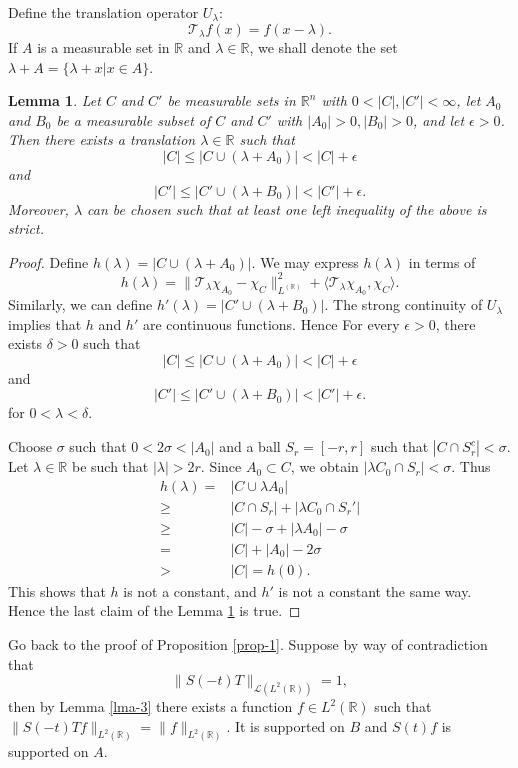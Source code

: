 \documentclass[12pt]{amsart}
\def\R {\mathbb{R}}
\newtheorem{lemma}[proposition]{Lemma}
\theoremstyle{definition}
\numberwithin{equation}{section}
\begin{document}
Define the translation operator $U_{\lambda}$:
$$
\mathcal{T}_{\lambda}f(x)=f(x-\lambda ).
$$
If $A$ is a measurable set in $\mathbb{R}$ and $\lambda\in \mathbb{R}$, we shall denote the set $\lambda+ A=\{\lambda+x\lvert x\in A\}$.
\begin{lemma}\label{lma-4}
  Let $C$ and $C'$ be  measurable sets in $\mathbb{R}^n$ with $0<|C|,|C'|<\infty$, let $A_0$ and $B_0$ be a measurable subset of $C$ and $C'$ with $|A_0|>0,|B_0|>0$, and let $\epsilon>0$. Then there exists a translation $\lambda\in \mathbb{R}$ such that 
  $$
  |C|\le|C\cup (\lambda+ A_0)|<|C|+\epsilon
  $$
  and
  $$
  |C'|\le |C'\cup (\lambda +B_0)|<|C'|+\epsilon.
  $$
  Moreover, $\lambda$ can be chosen such that at least one left inequality of the above is strict.

\end{lemma}
\begin{proof}
  Define $h(\lambda)=|C\cup( \lambda+ A_0)|$. We may express $h(\lambda)$ in terms of 
  $$
  h(\lambda)=\| \mathcal{T}_\lambda \chi_{A_0}-\chi_C \|^2_{L^(\mathbb{R})}+\langle \mathcal{T}_\lambda \chi_{A_0},\chi_{C}\rangle.
  $$
  Similarly, we can define $h'(\lambda)=|C'\cup(\lambda+ B_0)|$.
  The strong continuity of $U_\lambda$ implies that $h$ and $h'$ are continuous functions. Hence For every $\epsilon>0$, there exists $\delta>0$ such that 
   $$
   |C|\le |C\cup (\lambda+ A_0)|<|C|+\epsilon
   $$
   and
   $$
   |C'|\le |C'\cup (\lambda+ B_0)|<|C'|+\epsilon.
   $$
   for $0<\lambda<\delta$.

   Choose $\sigma$ such that $0<2\sigma <|A_0|$ and a ball $S_r=[-r,r]$ such that $|C\cap S_r^c|<\sigma$. Let $\lambda \in \mathbb{R}$ be such that $|\lambda|>2r$. Since $A_0\subset C$, we obtain $|\lambda C_0 \cap S_r|<\sigma$. Thus
   \begin{align*}
     h(\lambda)=&|C\cup \lambda A_0|\\
     \ge & |C\cap S_r|+|\lambda C_0\cap S_r'|\\
     \ge & |C|-\sigma +|\lambda A_0|-\sigma\\
     =& |C|+|A_0|-2\sigma\\
     >&|C|=h(0).
   \end{align*}
   This shows that $h$ is not a constant, and $h'$ is not a constant the same way. Hence the last claim of the Lemma \ref{lma-4} is true.
\end{proof}

Go back to the proof of Proposition \ref{prop-1}. Suppose by way of contradiction that
$$\|S(-t) T \|_{\mathcal{L}(L^2(\mathbb{R}))}=1,$$
then by Lemma \ref{lma-3} there exists a function $f\in L^2(\mathbb{R})$ such that $\|S(-t)Tf\|_{L^2(\R)}=\|f\|_{L^2(\R)}$. It is supported on $B$ and $S(t)f$ is supported on $A$.
\end{document}
